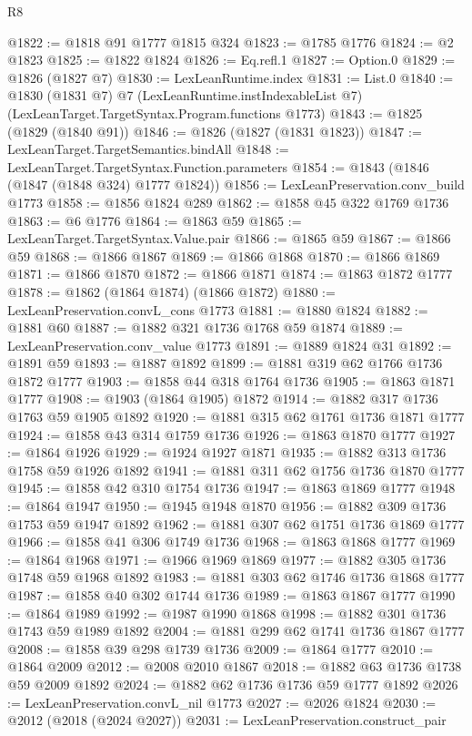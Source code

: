 \begin{lexlean}{R8}
\begin{coremodule}
@1822 := @1818 @91 @1777 @1815 @324
@1823 := @1785 @1776
@1824 := @2 @1823
@1825 := @1822 @1824
@1826 := Eq.refl.{1}
@1827 := Option.{0}
@1829 := @1826 (@1827 @7)
@1830 := LexLeanRuntime.index
@1831 := List.{0}
@1840 := @1830
    (@1831 @7)
    @7
    (LexLeanRuntime.instIndexableList @7)
    (LexLeanTarget.TargetSyntax.Program.functions @1773)
@1843 := @1825 (@1829 (@1840 @91))
@1846 := @1826 (@1827 (@1831 @1823))
@1847 := LexLeanTarget.TargetSemantics.bindAll
@1848 := LexLeanTarget.TargetSyntax.Function.parameters
@1854 := @1843 (@1846 (@1847 (@1848 @324) @1777 @1824))
@1856 := LexLeanPreservation.conv_build @1773
@1858 := @1856 @1824 @289
@1862 := @1858 @45 @322 @1769 @1736
@1863 := @6 @1776
@1864 := @1863 @59
@1865 := LexLeanTarget.TargetSyntax.Value.pair
@1866 := @1865 @59
@1867 := @1866 @59
@1868 := @1866 @1867
@1869 := @1866 @1868
@1870 := @1866 @1869
@1871 := @1866 @1870
@1872 := @1866 @1871
@1874 := @1863 @1872 @1777
@1878 := @1862 (@1864 @1874) (@1866 @1872)
@1880 := LexLeanPreservation.convL_cons @1773
@1881 := @1880 @1824
@1882 := @1881 @60
@1887 := @1882 @321 @1736 @1768 @59 @1874
@1889 := LexLeanPreservation.conv_value @1773
@1891 := @1889 @1824 @31
@1892 := @1891 @59
@1893 := @1887 @1892
@1899 := @1881 @319 @62 @1766 @1736 @1872 @1777
@1903 := @1858 @44 @318 @1764 @1736
@1905 := @1863 @1871 @1777
@1908 := @1903 (@1864 @1905) @1872
@1914 := @1882 @317 @1736 @1763 @59 @1905 @1892
@1920 := @1881 @315 @62 @1761 @1736 @1871 @1777
@1924 := @1858 @43 @314 @1759 @1736
@1926 := @1863 @1870 @1777
@1927 := @1864 @1926
@1929 := @1924 @1927 @1871
@1935 := @1882 @313 @1736 @1758 @59 @1926 @1892
@1941 := @1881 @311 @62 @1756 @1736 @1870 @1777
@1945 := @1858 @42 @310 @1754 @1736
@1947 := @1863 @1869 @1777
@1948 := @1864 @1947
@1950 := @1945 @1948 @1870
@1956 := @1882 @309 @1736 @1753 @59 @1947 @1892
@1962 := @1881 @307 @62 @1751 @1736 @1869 @1777
@1966 := @1858 @41 @306 @1749 @1736
@1968 := @1863 @1868 @1777
@1969 := @1864 @1968
@1971 := @1966 @1969 @1869
@1977 := @1882 @305 @1736 @1748 @59 @1968 @1892
@1983 := @1881 @303 @62 @1746 @1736 @1868 @1777
@1987 := @1858 @40 @302 @1744 @1736
@1989 := @1863 @1867 @1777
@1990 := @1864 @1989
@1992 := @1987 @1990 @1868
@1998 := @1882 @301 @1736 @1743 @59 @1989 @1892
@2004 := @1881 @299 @62 @1741 @1736 @1867 @1777
@2008 := @1858 @39 @298 @1739 @1736
@2009 := @1864 @1777
@2010 := @1864 @2009
@2012 := @2008 @2010 @1867
@2018 := @1882 @63 @1736 @1738 @59 @2009 @1892
@2024 := @1882 @62 @1736 @1736 @59 @1777 @1892
@2026 := LexLeanPreservation.convL_nil @1773
@2027 := @2026 @1824
@2030 := @2012 (@2018 (@2024 @2027))
@2031 := LexLeanPreservation.construct_pair

\end{coremodule}
\end{lexlean}
